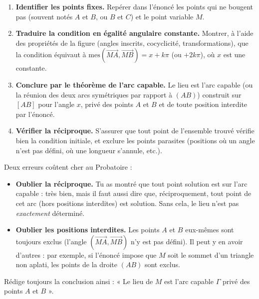 \documentclass[11pt]{article}
\begin{document}
\begin{methode}
\begin{enumerate}
\item \textbf{Identifier les points fixes.} Repérer dans l'énoncé les points qui ne bougent pas (souvent notés $A$ et $B$, ou $B$ et $C$) et le point variable $M$.
\item \textbf{Traduire la condition en égalité angulaire constante.} Montrer, à l'aide des propriétés de la figure (angles inscrits, cocyclicité, transformations), que la condition équivaut à $\text{mes}(\overrightarrow{MA},\overrightarrow{MB}) = x + k\pi$ (ou $+2k\pi$), où $x$ est une constante.
\item \textbf{Conclure par le théorème de l'arc capable.} Le lieu est l'arc capable (ou la réunion des deux arcs symétriques par rapport à $(AB)$) construit sur $[AB]$ pour l'angle $x$, privé des points $A$ et $B$ et de toute position interdite par l'énoncé.
\item \textbf{Vérifier la réciproque.} S'assurer que tout point de l'ensemble trouvé vérifie bien la condition initiale, et exclure les points parasites (positions où un angle n'est pas défini, où une longueur s'annule, etc.).
\end{enumerate}
\end{methode}

\begin{attention}
Deux erreurs coûtent cher au Probatoire :
\begin{itemize}
\item \textbf{Oublier la réciproque.} Tu as montré que tout point solution est sur l'arc capable : très bien, mais il faut aussi dire que, réciproquement, tout point de cet arc (hors positions interdites) est solution. Sans cela, le lieu n'est pas \emph{exactement} déterminé.
\item \textbf{Oublier les positions interdites.} Les points $A$ et $B$ eux-mêmes sont toujours exclus (l'angle $(\overrightarrow{MA},\overrightarrow{MB})$ n'y est pas défini). Il peut y en avoir d'autres : par exemple, si l'énoncé impose que $M$ soit le sommet d'un triangle non aplati, les points de la droite $(AB)$ sont exclus.
\end{itemize}
Rédige toujours la conclusion ainsi : « Le lieu de $M$ est l'arc capable $\Gamma$ privé des points $A$ et $B$ ».
\end{attention}
\end{document}
